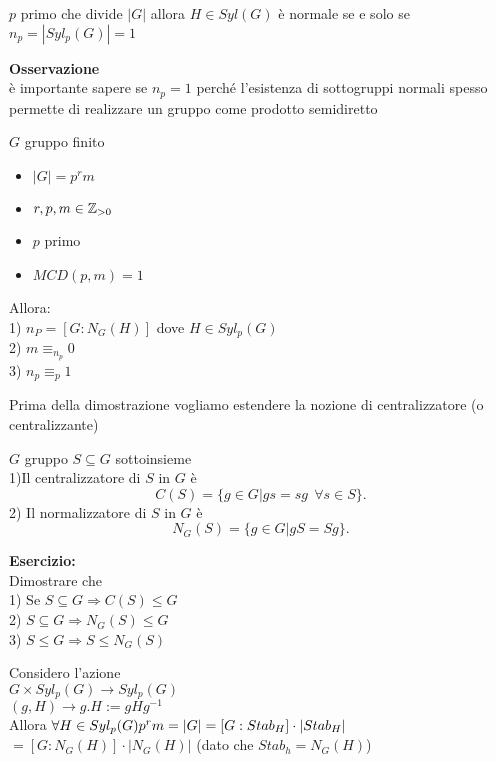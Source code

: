 \documentclass[12px]{article}
\begin{document}
{\begin{dimo}
		\begin{coro}
			$p$ primo che divide $|G|$ allora  $H\in Syl(G)$ è normale se e solo se\\ $n_p = |Syl_p(G)| = 1$
		\end{coro}
		\textbf{Osservazione}\\
		è importante sapere se $n_p = 1$ perché l'esistenza di sottogruppi normali spesso permette di realizzare un gruppo come prodotto semidiretto
	\\
	\begin{teo}
		$G$ gruppo finito
		\begin{itemize}
			\item $|G| = p^r m$
			\item $r,p,m\in \mathbb{Z}_{>0}$
			\item $p$ primo
			\item $MCD(p,m) = 1$
		\end{itemize}
		Allora:\\
		1) $n_P = [G:N_G(H)]$ dove  $H\in Syl_p(G)$ \\
		2) $m\equiv_{n_p} 0$\\
		3)  $n_p\equiv_p 1$
	\end{teo}
	Prima della dimostrazione vogliamo estendere la nozione di centralizzatore (o centralizzante)
	\newpage
	\begin{defi}[Normalizzatore]
		$G$ gruppo $S\subseteq G$ sottoinsieme\\
		1)Il centralizzatore di  $S$ in  $G$ è
		 \[
			 C(S) = \{g\in G| gs = sg \ \ \forall s\in S\}
		.\] 
		2) Il normalizzatore di $S$ in $G$ è 
		\[
			N_G(S) = \{g\in G | gS = Sg\}
		.\] 
	\end{defi}
	\textbf{Esercizio:}\\
	Dimostrare che\\
	1) Se $S\subseteq G \Rightarrow C(S) \leq G$ \\
	2) $S\subseteq G \Rightarrow N_G(S)\leq G$ \\
	3) $S\leq G \Rightarrow S\leq N_G(S)$ \\
	\begin{dimo}
		Considero l'azione\\
		$G\times Syl_p(G) \rightarrow Syl_p(G)$\\
		$(g,H) \rightarrow g.H := gHg^{-1}$ \\
		Allora $\forall H\in Syl_p(G)\\
		p^rm = |G| = [G:Stab_H]\cdot |Stab_H|$\\
		 $= [G:N_G(H)]\cdot |N_G(H)|$\hfill
		 (dato che $Stab_h = N_G(H)$)\\

\end{dimo}
\end{dimo}}
\end{document}
